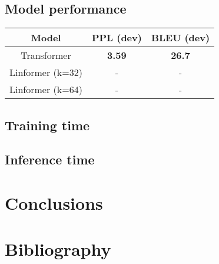 \documentclass[titlepage]{article}
\begin{document}
\subsection{Model performance}

\begin{center}
  \begin{tabular}{c c c}
    \toprule
    Model                 & PPL (dev) & BLEU (dev)  \\
    \midrule
    Transformer       & \bf{3.59} & \bf{26.7}   \\
    Linformer (k=32)  & -         & -           \\
    Linformer (k=64)  & -         & -           \\
    \bottomrule
  \end{tabular}
\end{center}

\subsection{Training time}

\subsection{Inference time}

\section{Conclusions}

\section*{Bibliography}
\nocite{*}
\printbibliography
\end{document}
